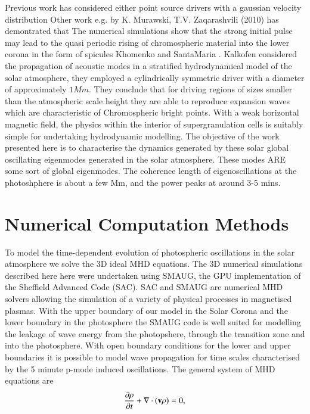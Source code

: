 \documentclass[final,1p]{elsarticle}
\begin{document}
Previous work has considered either point source drivers with a gaussian velocity distribution Other work e.g. by K. Murawski, T.V. Zaqarashvili (2010) \cite{Murawski2010} has demontrated that The numerical simulations show that the strong initial pulse may lead to the quasi periodic rising of chromospheric material into the lower corona in the form of spicules Khomenko and SantaMaria \cite{Khomenko2012}. Kalkofen \cite{Kalkofen2010} considered the propagation of acoustic modes in a stratified hydrodynamical model of the solar atmosphere, they employed a cylindrically symmetric driver with a diameter of approximately $1Mm$. They conclude that for driving regions of sizes smaller than the atmospheric scale height they are able to reproduce expansion waves which are characteristic of Chromospheric bright points. With a weak horizontal magnetic field, the physics within the interior of supergranulation cells \cite{Lites2008} is suitably simple for undertaking hydrodynamic modelling. The objective of the work presented here  is to characterise the dynamics generated by these solar global oscillating eigenmodes generated in the solar atmosphere.  These modes ARE some sort of global eigenmodes. The coherence length of eigenoscillations at the photoshphere is about a few Mm, and the power peaks at around 3-5 mins. 






\section{Numerical Computation Methods}
To model the time-dependent evolution of photospheric oscillations in the solar atmosphere  we solve the 3D ideal MHD equations.   The 3D numerical simulations described here here were undertaken using SMAUG, the GPU implementation of the Sheffield Advanced Code (SAC)\cite{Griffiths2015}\cite{Shelyag2008}. SAC and SMAUG are numerical MHD solvers allowing the simulation of a variety of physical processes in magnetised plasmas.  With the upper boundary of our model in the Solar Corona and the lower boundary in the photosphere the SMAUG code is well suited for modelling the leakage of wave energy from the photopshere, through the transition zone and into the photosphere. With open boundary conditions for the lower and upper boundaries it is possible to model wave propagation for time scales characterised by the 5 minute p-mode induced oscillations. The general system of MHD equations are
\begin{equation}\label{eqdens}
{{\partial \rho}\over{\partial t}}+\nabla\cdot\left( {\bf v}\rho\right)=0,
\end{equation}
\end{document}
